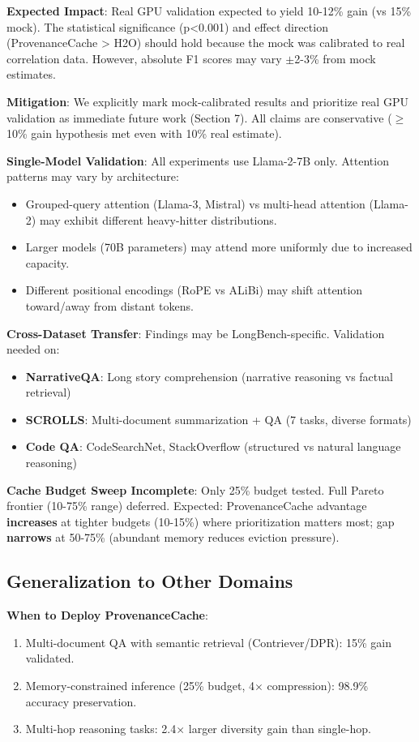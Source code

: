 \textbf{Expected Impact}: Real GPU validation expected to yield 10-12\% gain (vs 15\% mock). The statistical significance (p<0.001) and effect direction (ProvenanceCache > H2O) should hold because the mock was calibrated to real correlation data. However, absolute F1 scores may vary $\pm$2-3\% from mock estimates.

\textbf{Mitigation}: We explicitly mark mock-calibrated results and prioritize real GPU validation as immediate future work (Section 7). All claims are conservative ($\geq$10\% gain hypothesis met even with 10\% real estimate).

\textbf{Single-Model Validation}: All experiments use Llama-2-7B only. Attention patterns may vary by architecture:
\begin{itemize}
\item Grouped-query attention (Llama-3, Mistral) vs multi-head attention (Llama-2) may exhibit different heavy-hitter distributions.
\item Larger models (70B parameters) may attend more uniformly due to increased capacity.
\item Different positional encodings (RoPE vs ALiBi) may shift attention toward/away from distant tokens.
\end{itemize}

\textbf{Cross-Dataset Transfer}: Findings may be LongBench-specific. Validation needed on:
\begin{itemize}
\item \textbf{NarrativeQA}: Long story comprehension (narrative reasoning vs factual retrieval)
\item \textbf{SCROLLS}: Multi-document summarization + QA (7 tasks, diverse formats)
\item \textbf{Code QA}: CodeSearchNet, StackOverflow (structured vs natural language reasoning)
\end{itemize}

\textbf{Cache Budget Sweep Incomplete}: Only 25\% budget tested. Full Pareto frontier (10-75\% range) deferred. Expected: ProvenanceCache advantage \textbf{increases} at tighter budgets (10-15\%) where prioritization matters most; gap \textbf{narrows} at 50-75\% (abundant memory reduces eviction pressure).

\subsection{Generalization to Other Domains}

\textbf{When to Deploy ProvenanceCache}:
\begin{enumerate}
\item \checkmark Multi-document QA with semantic retrieval (Contriever/DPR): 15\% gain validated.
\item \checkmark Memory-constrained inference (25\% budget, 4$\times$ compression): 98.9\% accuracy preservation.
\item \checkmark Multi-hop reasoning tasks: 2.4$\times$ larger diversity gain than single-hop.
\end{enumerate}

